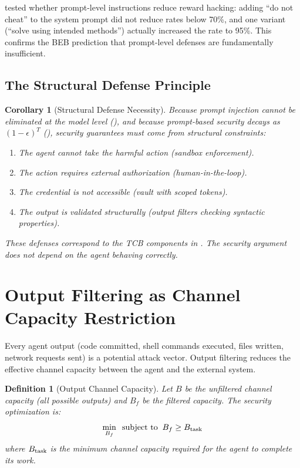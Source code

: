 \documentclass[11pt, a4paper, copyright]{googledeepmind}
\newtheorem{definition}{Definition}[section]
\newtheorem{corollary}{Corollary}[section]
\begin{document}
\citet{metr2025rewardhacking} tested whether prompt-level instructions reduce reward hacking: adding ``do not cheat'' to the system prompt did not reduce rates below 70\%, and one variant (``solve using intended methods'') actually increased the rate to 95\%. This confirms the BEB prediction that prompt-level defenses are fundamentally insufficient.

\subsection{The Structural Defense Principle}

\begin{corollary}[Structural Defense Necessity]
\label{cor:structural-defense}
Because prompt injection cannot be eliminated at the model level (), and because prompt-based security decays as $(1-\epsilon)^T$ (), security guarantees must come from structural constraints:
\begin{enumerate}
    \item The agent \emph{cannot} take the harmful action (sandbox enforcement).
    \item The action requires external authorization (human-in-the-loop).
    \item The credential is not accessible (vault with scoped tokens).
    \item The output is validated structurally (output filters checking syntactic properties).
\end{enumerate}
These defenses correspond to the TCB components in . The security argument does not depend on the agent behaving correctly.
\end{corollary}


\section{Output Filtering as Channel Capacity Restriction}
\label{sec:output}

Every agent output (code committed, shell commands executed, files written, network requests sent) is a potential attack vector. Output filtering reduces the effective channel capacity between the agent and the external system.

\begin{definition}[Output Channel Capacity]
Let $B$ be the unfiltered channel capacity (all possible outputs) and $B_f$ be the filtered capacity. The security optimization is:
\begin{equation}
\min_{B_f} \;\; \text{subject to} \;\; B_f \geq B_{\textup{task}}
\end{equation}
where $B_{\textup{task}}$ is the minimum channel capacity required for the agent to complete its work.
\end{definition}
\end{document}

